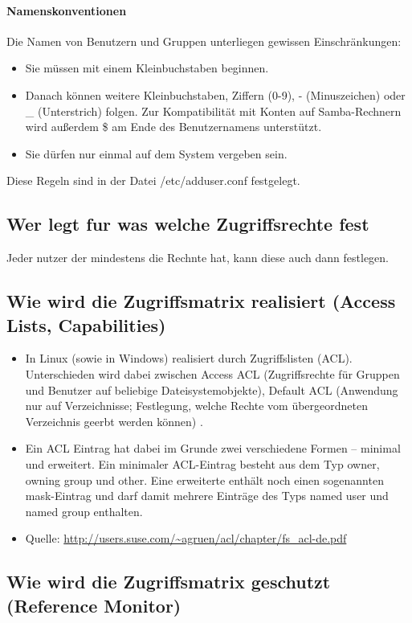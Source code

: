 \documentclass{scrartcl}
\begin{document}
\paragraph{Namenskonventionen}
Die Namen von Benutzern und Gruppen unterliegen gewissen Einschränkungen:
\begin{itemize}
  \item Sie müssen mit einem Kleinbuchstaben beginnen.
  \item Danach können weitere Kleinbuchstaben, Ziffern (0-9), - (Minuszeichen)
    oder _ (Unterstrich) folgen. Zur Kompatibilität mit Konten auf
    Samba-Rechnern wird außerdem \$ am Ende des Benutzernamens unterstützt.
  \item Sie dürfen nur einmal auf dem System vergeben sein.
\end{itemize}
Diese Regeln sind in der Datei /etc/adduser.conf festgelegt.

\subsection*{Wer legt fur was welche Zugriffsrechte fest}
Jeder nutzer der mindestens die Rechnte hat, kann diese auch dann festlegen.

\subsection*{Wie wird die Zugriffsmatrix realisiert (Access Lists, Capabilities)}

\begin{itemize}
  \item In Linux (sowie in Windows) realisiert durch Zugriffslisten (ACL). Unterschieden wird
  dabei zwischen Access ACL (Zugriffsrechte für Gruppen und Benutzer auf beliebige Dateisystemobjekte),
  Default ACL (Anwendung nur auf Verzeichnisse; Festlegung, welche Rechte vom übergeordneten
  Verzeichnis geerbt werden können) .
  \item Ein ACL Eintrag hat dabei im Grunde zwei verschiedene Formen – minimal und erweitert. Ein
  minimaler ACL-Eintrag besteht aus dem Typ owner, owning group und other. Eine erweiterte enthält
  noch einen sogenannten mask-Eintrag und darf damit mehrere Einträge des Typs named user und named
  group enthalten.
  \item Quelle: \url{http://users.suse.com/~agruen/acl/chapter/fs_acl-de.pdf}
\end{itemize}

\subsection*{Wie wird die Zugriffsmatrix geschutzt (Reference Monitor)}
\end{document}
